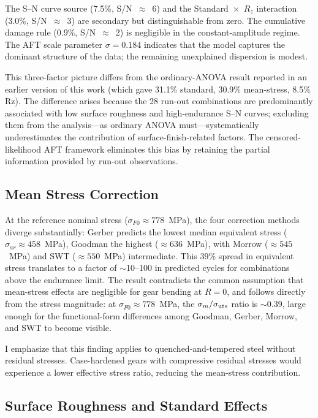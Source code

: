 \documentclass[12pt,a4paper]{article}
\begin{document}
The S--N curve source (7.5\%, S/N~$\approx$~6) and the
Standard~$\times$~$R_z$ interaction (3.0\%, S/N~$\approx$~3) are secondary but
distinguishable from zero. The cumulative damage rule (0.9\%,
S/N~$\approx$~2) is negligible in the constant-amplitude regime. The
AFT scale parameter $\sigma = 0.184$ indicates that the model
captures the dominant structure of the data; the remaining
unexplained dispersion is modest.

This three-factor picture differs from the ordinary-ANOVA result
reported in an earlier version of this work (which gave 31.1\%
standard, 30.9\% mean-stress, 8.5\% Rz). The difference arises
because the 28 run-out combinations are predominantly associated
with low surface roughness and high-endurance S--N curves; excluding
them from the analysis---as ordinary ANOVA must---systematically
underestimates the contribution of surface-finish-related factors.
The censored-likelihood AFT framework eliminates this bias by
retaining the partial information provided by run-out observations.

\subsection{Mean Stress Correction}

At the reference nominal stress ($\sigma_{F0} \approx 778$~MPa), the
four correction methods diverge substantially: Gerber predicts the
lowest median equivalent stress ($\sigma_{ar} \approx 458$~MPa),
Goodman the highest ($\approx 636$~MPa), with Morrow ($\approx 545$~MPa)
and SWT ($\approx 550$~MPa) intermediate. This 39\% spread in
equivalent stress translates to a factor of $\sim$10--100 in predicted
cycles for combinations above the endurance limit. The result contradicts
the common assumption that mean-stress effects are negligible for gear
bending at $R=0$, and follows directly from the stress magnitude: at
$\sigma_{F0} \approx 778$~MPa, the $\sigma_m/\sigma_{\rm uts}$ ratio
is $\sim$0.39, large enough for the functional-form differences among
Goodman, Gerber, Morrow, and SWT to become visible.

I emphasize that this finding applies to quenched-and-tempered steel
without residual stresses. Case-hardened gears with compressive residual
stresses would experience a lower effective stress ratio, reducing the
mean-stress contribution.

\subsection{Surface Roughness and Standard Effects}
\end{document}
